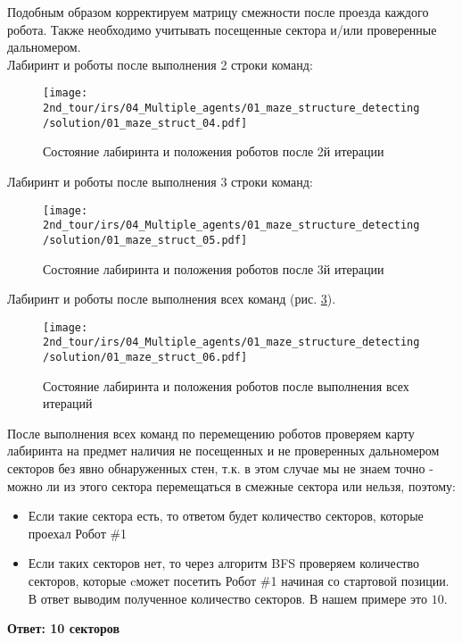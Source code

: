 Подобным образом корректируем матрицу смежности после проезда каждого робота. Также необходимо учитывать посещенные сектора и/или проверенные дальномером.\\

Лабиринт и роботы после выполнения 2 строки команд:
\begin{figure}[h!]
	\centering
	\texttt{[image: 2nd\_tour/irs/04\_Multiple\_agents/01\_maze\_structure\_detecting/solution/01\_maze\_struct\_04.pdf]}
	\caption{Состояние лабиринта и положения роботов после 2й итерации}
	\label{fig:01_maze_struct_04}
\end{figure}

Лабиринт и роботы после выполнения 3 строки команд:
\begin{figure}[h!]
	\centering
	\texttt{[image: 2nd\_tour/irs/04\_Multiple\_agents/01\_maze\_structure\_detecting/solution/01\_maze\_struct\_05.pdf]}
	\caption{Состояние лабиринта и положения роботов после 3й итерации}
	\label{fig:01_maze_struct_05}
\end{figure}

Лабиринт и роботы после выполнения всех команд (рис. \ref{fig:01_maze_struct_06}).
\begin{figure}[h!]
	\centering
	\texttt{[image: 2nd\_tour/irs/04\_Multiple\_agents/01\_maze\_structure\_detecting/solution/01\_maze\_struct\_06.pdf]}
	\caption{Состояние лабиринта и положения роботов после выполнения всех итераций}
	\label{fig:01_maze_struct_06}
\end{figure}

После выполнения всех команд по перемещению роботов проверяем карту лабиринта на предмет наличия не посещенных и не проверенных дальномером секторов без явно обнаруженных стен, т.к. в этом случае мы не знаем точно - можно ли из этого сектора перемещаться в смежные сектора или нельзя, поэтому:
\begin{itemize}
	\item  Если такие сектора есть, то ответом будет количество секторов, которые проехал Робот \#1
	\item Если таких секторов нет, то через алгоритм BFS проверяем количество секторов, которые cможет посетить Робот \#1 начиная со стартовой позиции. \\
	В ответ выводим полученное количество секторов. В нашем примере это $10$.
\end{itemize}


\textbf{Ответ: 10 секторов}


\codeExample


